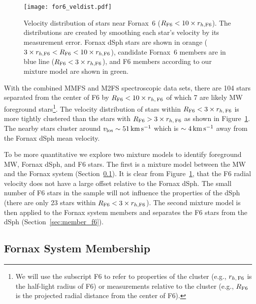 \documentclass[twocolumn]{aastex63}
\begin{document}
\begin{figure}
\texttt{[image: for6\_veldist.pdf]}
\caption{Velocity distribution of stars near Fornax~6 ($R_{\rm F6} < 10\times r_{h, {\rm F6}}$). 
The distributions are created by smoothing each star's velocity by its measurement error.
Fornax dSph stars are shown in orange ($3\times r_{h, {\rm F6}} < R_{\rm F6} < 10\times r_{ h, {\rm F6}}$), candidate Fornax~6 members are in blue line ($R_{\rm F6} < 3\times r_{h, {\rm F6}}$), and F6 members according to our mixture model are shown in green. }
\label{fig:vel_hist}
\end{figure}





With the combined MMFS and M2FS spectroscopic data sets, there are 104 stars separated from the center of F6 by $R_{\rm F6}<10\times r_{h, \, {\rm F6}}$ of which 7 are likely MW foreground stars\footnote{We will use the subscript F6 to refer to properties of the cluster (e.g., $r_{h, \, {\rm F6}}$ is the half-light radius of F6) or measurements relative to the cluster (e.g., $R_{\rm F6}$ is the projected radial distance from the center of F6).}.
The velocity distribution of stars within $R_{\rm F6}<3\times r_{h, \, {\rm F6}}$ is more tightly clustered than the stars with $R_{\rm F6}>3\times r_{h, \, {\rm F6}}$ as shown in Figure~\ref{fig:vel_hist}.
The nearby stars cluster around $v_{\rm los}\sim 51 \mathrm{\,km} \mathrm{\,s}^{-1}$ which is $\sim 4 \mathrm{\,km} \mathrm{\,s}^{-1}$ away from the Fornax dSph mean velocity. 


To be more quantitative we explore two mixture models to identify foreground MW, Fornax dSph, and F6 stars.
The first is a mixture model between the MW and the Fornax system (Section~\ref{sec:dsph_membership}).
It is clear from Figure~\ref{fig:vel_hist}, that the F6  radial velocity does not have a large offset relative to the Fornax dSph.
The small number of F6 stars in the sample will not influence the properties of the dSph (there are only 23 stars within $R_{\rm F6}<3 \times r_{h, {\rm F6}}$).
The second mixture model is then applied to the Fornax system members and separates the F6 stars from the dSph (Section~\ref{sec:member_f6}).



\subsection{Fornax System Membership}
\label{sec:dsph_membership}
\end{document}
